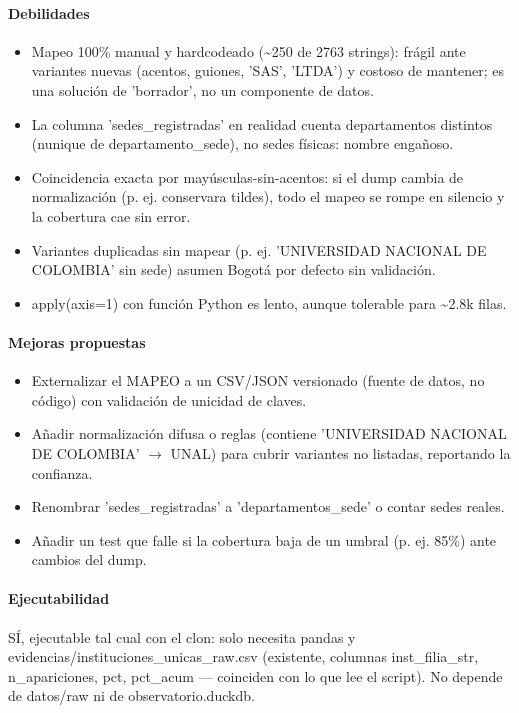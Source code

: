 \paragraph{Debilidades}
\begin{itemize}
  \item Mapeo 100\% manual y hardcodeado (\textasciitilde{}250 de 2763 strings): frágil ante variantes nuevas (acentos, guiones, 'SAS', 'LTDA') y costoso de mantener; es una solución de 'borrador', no un componente de datos.
  \item La columna 'sedes\_registradas' en realidad cuenta departamentos distintos (nunique de departamento\_sede), no sedes físicas: nombre engañoso.
  \item Coincidencia exacta por mayúsculas-sin-acentos: si el dump cambia de normalización (p. ej. conservara tildes), todo el mapeo se rompe en silencio y la cobertura cae sin error.
  \item Variantes duplicadas sin mapear (p. ej. 'UNIVERSIDAD NACIONAL DE COLOMBIA' sin sede) asumen Bogotá por defecto sin validación.
  \item apply(axis=1) con función Python es lento, aunque tolerable para \textasciitilde{}2.8k filas.
\end{itemize}

\paragraph{Mejoras propuestas}
\begin{itemize}
  \item Externalizar el MAPEO a un CSV/JSON versionado (fuente de datos, no código) con validación de unicidad de claves.
  \item Añadir normalización difusa o reglas (contiene 'UNIVERSIDAD NACIONAL DE COLOMBIA' $\rightarrow$ UNAL) para cubrir variantes no listadas, reportando la confianza.
  \item Renombrar 'sedes\_registradas' a 'departamentos\_sede' o contar sedes reales.
  \item Añadir un test que falle si la cobertura baja de un umbral (p. ej. 85\%) ante cambios del dump.
\end{itemize}

\paragraph{Ejecutabilidad}
SÍ, ejecutable tal cual con el clon: solo necesita pandas y evidencias/instituciones\_unicas\_raw.csv (existente, columnas inst\_filia\_str, n\_apariciones, pct, pct\_acum --- coinciden con lo que lee el script). No depende de datos/raw ni de observatorio.duckdb.

